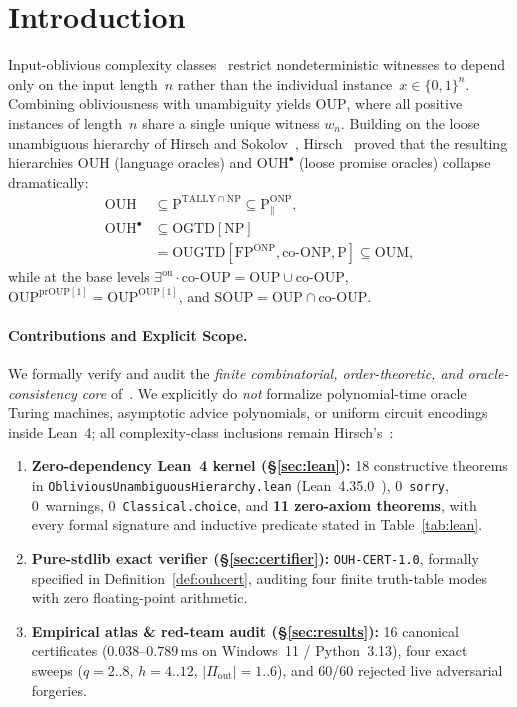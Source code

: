 \documentclass[10pt,twocolumn]{article}
\newcommand{\OUH}{\mathrm{OUH}}
\newcommand{\OUP}{\mathrm{OUP}}
\newcommand{\ONP}{\mathrm{ONP}}
\newcommand{\SOUP}{\mathrm{SOUP}}
\newcommand{\OGTD}{\mathrm{OGTD}}
\newcommand{\OUGTD}{\mathrm{OUGTD}}
\newcommand{\OUM}{\mathrm{OUM}}
\begin{document}
\section{Introduction}
Input-oblivious complexity classes~\cite{fortnow2009fixed,aaronson2014full} restrict nondeterministic witnesses to depend only on the input length~$n$ rather than the individual instance~$x \in \{0,1\}^n$. Combining obliviousness with unambiguity yields $\OUP$, where all positive instances of length~$n$ share a single unique witness $w_n$. Building on the loose unambiguous hierarchy of Hirsch and Sokolov~\cite{hirsch2015unambiguous}, Hirsch~\cite{hirsch2026oblivious} proved that the resulting hierarchies $\OUH$ (language oracles) and $\OUH^\bullet$ (loose promise oracles) collapse dramatically:
\begin{equation}
\begin{aligned}
  \OUH &\subseteq \mathrm{P}^{\mathrm{TALLY}\cap\mathrm{NP}} \subseteq \mathrm{P}_{\|}^{\ONP}, \\
  \OUH^\bullet &\subseteq \OGTD[\mathrm{NP}] \\
  &= \OUGTD[\mathrm{FP}^{\ONP},\mathrm{co}\text{-}\ONP,\mathrm{P}] \subseteq \OUM,
\end{aligned}
  \label{eq:collapses}
\end{equation}
while at the base levels $\exists^{\mathrm{ou}}\!\cdot\mathrm{co}\text{-}\OUP = \OUP \cup \mathrm{co}\text{-}\OUP$, $\OUP^{\mathrm{prOUP}[1]} = \OUP^{\OUP[1]}$, and $\SOUP = \OUP \cap \mathrm{co}\text{-}\OUP$.

\paragraph{Contributions and Explicit Scope.}
We formally verify and audit the \emph{finite combinatorial, order-theoretic, and oracle-consistency core} of~\cite{hirsch2026oblivious}. We explicitly do \emph{not} formalize polynomial-time oracle Turing machines, asymptotic advice polynomials, or uniform circuit encodings inside Lean~4; all complexity-class inclusions remain Hirsch's~\cite{hirsch2026oblivious}:
\begin{enumerate}[leftmargin=*,nosep]
  \item \textbf{Zero-dependency Lean~4 kernel (\S\ref{sec:lean}):} 18 constructive theorems in \texttt{ObliviousUnambiguousHierarchy.lean} (Lean~4.35.0~\cite{demoura2021lean4}), 0~\texttt{sorry}, 0~warnings, 0~\texttt{Classical.choice}, and \textbf{11 zero-axiom theorems}, with every formal signature and inductive predicate stated in Table~\ref{tab:lean}.
  \item \textbf{Pure-stdlib exact verifier (\S\ref{sec:certifier}):} \texttt{OUH-CERT-1.0}, formally specified in Definition~\ref{def:ouhcert}, auditing four finite truth-table modes with zero floating-point arithmetic.
  \item \textbf{Empirical atlas \& red-team audit (\S\ref{sec:results}):} 16 canonical certificates ($0.038$--$0.789\,\mathrm{ms}$ on Windows~11 / Python~3.13), four exact sweeps ($q=2..8$, $h=4..12$, $|\Pi_{\mathrm{out}}|=1..6$), and 60/60 rejected live adversarial forgeries.
\end{enumerate}
\end{document}
